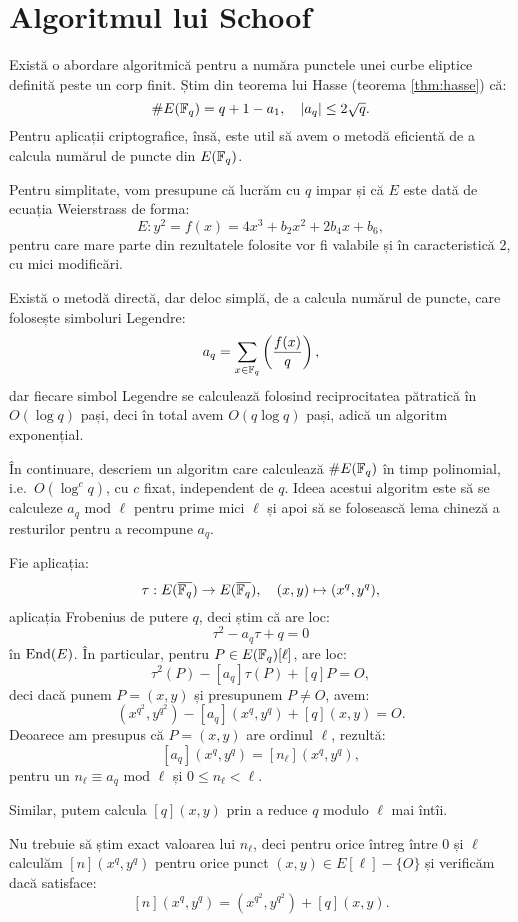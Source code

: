 
\chapter{Algoritmul lui Schoof}

Există o abordare algoritmică pentru a număra punctele unei curbe
eliptice definită peste un corp finit. Știm din teorema lui Hasse
(teorema \ref{thm:hasse}) că:
\[
    \# E(\mathbb{F}_q) = q + 1 - a_1, \quad |a_q| \leq 2 \sqrt{q}.
\]
Pentru aplicații criptografice, însă, este util să avem o metodă
eficientă de a calcula numărul de puncte din $ E(\mathbb{F}_q) $.

Pentru simplitate, vom presupune că lucrăm cu $ q $ impar și
că $ E $ este dată de ecuația Weierstrass de forma:
\[
    E: y^2 = f(x) = 4x^3 + b_2x^2 + 2b_4x + b_6,
\]
pentru care mare parte din rezultatele folosite vor fi valabile
și în caracteristică 2, cu mici modificări.

Există o metodă directă, dar deloc simplă, de a calcula numărul de
puncte, care folosește simboluri Legendre:
\[
    a_q = \sum_{x \in \mathbb{F}_q} \left( \dfrac{f(x)}{q} \right),
\]
dar fiecare simbol Legendre se calculează folosind reciprocitatea
pătratică în $ O(\log q) $ pași, deci în total avem $ O(q \log q) $
pași, adică un algoritm exponențial.

În continuare, descriem un algoritm care calculează $ \# E(\mathbb{F}_q) $ în
timp polinomial, i.e.\ $ O(\log^c q) $, cu $ c $ fixat, independent de $ q $.
Ideea acestui algoritm este să se calculeze $ a_q \text{ mod } \ell $
pentru prime mici $ \ell $ și apoi să se folosească lema chineză a resturilor
pentru a recompune $ a_q $.

Fie aplicația:
\[
    \tau : E(\overline{\mathbb{F}_q}) \to E(\overline{\mathbb{F}_q}), \quad (x, y) \mapsto (x^q, y^q),
\]
aplicația Frobenius de putere $ q $, deci știm că are loc:
\[
      \tau^2 - a_q \tau + q = 0
\]
în $ \mathrm{End}(E) $. În particular, pentru $ P \in E(\mathbb{F}_q)[\ell] $, are loc:
\[
    \tau^2(P) - [a_q]\tau(P) + [q]P = O,
\]
deci dacă punem $ P = (x, y) $ și presupunem $ P \neq O $, avem:
\[
    (x^{q^2}, y^{q^2}) - [a_q](x^q, y^q) + [q](x, y) = O.
\]
Deoarece am presupus că $ P = (x, y) $ are ordinul $ \ell $, rezultă:
\[
    [a_q](x^q, y^q) = [n_\ell](x^q, y^q),
\]
pentru un $ n_\ell \equiv a_q \text{ mod } \ell $ și $ 0 \leq n_\ell < \ell $.

Similar, putem calcula $ [q](x, y) $ prin a reduce $ q $ modulo $ \ell $ mai
întîi.

Nu trebuie să știm exact valoarea lui $ n_\ell $, deci pentru orice întreg
între 0 și $ \ell $ calculăm $ [n](x^q, y^q) $ pentru orice punct
$ (x, y) \in E[\ell] - \{ O \} $ și verificăm dacă satisface:
\[
    [n](x^q, y^q) = (x^{q^2}, y^{q^2}) + [q](x, y).
\]

